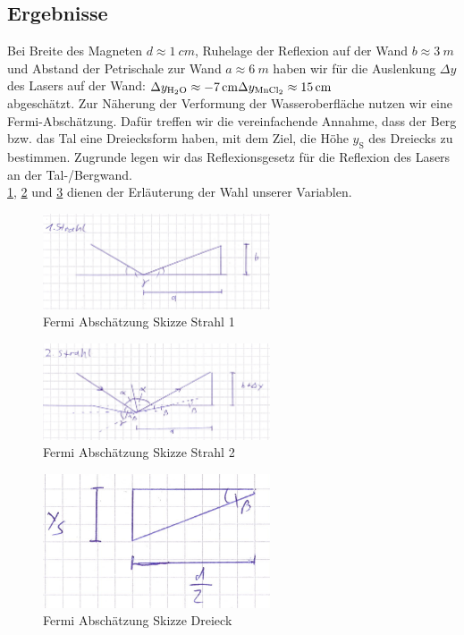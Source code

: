 \documentclass[
	a4paper,
	12pt,
	pagesize,
	ngerman
]{scrartcl}
\begin{document}
	\subsection{Ergebnisse}
	Bei Breite des Magneten $d \approx \SI{1}{cm}$, Ruhelage der Reflexion auf der Wand $b \approx \SI{3}{m}$ und Abstand der Petrischale zur Wand $a \approx \SI{6}{m}$ haben wir für die Auslenkung $\Delta y$ des Lasers auf der Wand: \newline
	$ \Delta y_\text{\ce{H2O}} \approx \SI{-7}{cm} \\
	\Delta y_\text{\ce{MnCl2}} \approx \SI{15}{cm}$\\
	abgeschätzt.
	Zur Näherung der Verformung der Wasseroberfläche nutzen wir eine Fermi-Abschätzung. Dafür treffen wir die vereinfachende Annahme, dass der Berg bzw. das Tal eine Dreiecksform haben, mit dem Ziel, die Höhe $y_\text{S}$ des Dreiecks zu bestimmen. Zugrunde legen wir das Reflexionsgesetz für die Reflexion des Lasers an der Tal-/Bergwand.\\
	\cref{Fermi1}, \cref{Fermi2} und \cref{Fermi3} dienen der Erläuterung der Wahl unserer Variablen.
	\begin{figure}[htb]
	  \centering
	    \includegraphics[width=0.6\textwidth]{Fermi1} 
	  \caption{Fermi Abschätzung Skizze Strahl 1}
		\label{Fermi1}
	\end{figure}
	\begin{figure}[htb]
	  \centering
	    \includegraphics[width=0.6\textwidth]{Fermi2} 
	  \caption{Fermi Abschätzung Skizze Strahl 2}
		\label{Fermi2}
	\end{figure}
	\begin{figure}[htb]
	  \centering
	    \includegraphics[width=0.6\textwidth]{Fermi3} 
	  \caption{Fermi Abschätzung Skizze Dreieck}
		\label{Fermi3}
	\end{figure}
\end{document}
